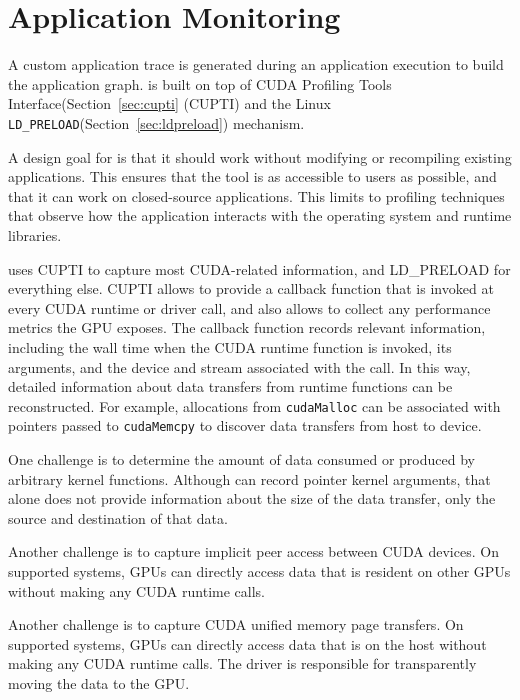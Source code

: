 \section{Application Monitoring}

A custom application trace is generated during an application execution to build the application graph.
 is built on top of CUDA Profiling Tools Interface(Section~\ref{sec:cupti} (CUPTI) and the Linux \texttt{LD\_PRELOAD}(Section~\ref{sec:ldpreload}) mechanism.

A design goal for  is that it should work without modifying or recompiling existing applications.
This ensures that the tool is as accessible to users as possible, and that it can work on closed-source applications.
This limits  to profiling techniques that observe how the application interacts with the operating system and runtime libraries.

 uses CUPTI to capture most CUDA-related information, and LD\_PRELOAD for everything else.
CUPTI allows  to provide a callback function that is invoked at every CUDA runtime or driver call, and also allows  to collect any performance metrics the GPU exposes.
The callback function records relevant information, including the wall time when the CUDA runtime function is invoked, its arguments, and the device and stream associated with the call.
In this way, detailed information about data transfers from runtime functions can be reconstructed.
For example, allocations from \texttt{cudaMalloc} can be associated with pointers passed to \texttt{cudaMemcpy} to discover data transfers from host to device.

One challenge is to determine the amount of data consumed or produced by arbitrary kernel functions.
Although  can record pointer kernel arguments, that alone does not provide information about the size of the data transfer, only the source and destination of that data.

Another challenge is to capture implicit peer access between CUDA devices.
On supported systems, GPUs can directly access data that is resident on other GPUs without making any CUDA runtime calls.

Another challenge is to capture CUDA unified memory page transfers.
On supported systems, GPUs can directly access data that is on the host without making any CUDA runtime calls.
The driver is responsible for transparently moving the data to the GPU.


